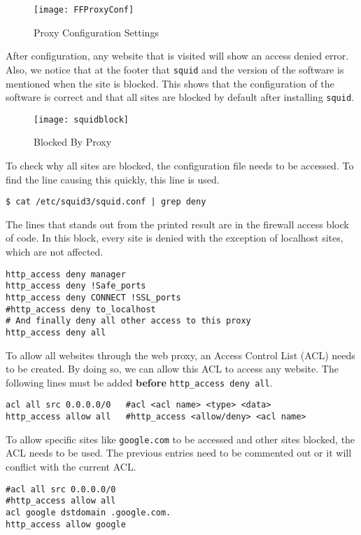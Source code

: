 \documentclass[a4paper,12pt]{article}
\begin{document}
\begin{figure}[H]
\centering
\texttt{[image: FFProxyConf]}
\caption{Proxy Configuration Settings}
\label{fig:ffproxyconf}
\end{figure}
\noindent After configuration, any website that is visited will show an access denied error. Also, we notice that at the footer that \texttt{squid} and the version of the software is mentioned when the site is blocked. This shows that the configuration of the software is correct and that all sites are blocked by default after installing \texttt{squid}.

\begin{figure}[H]
\centering
\texttt{[image: squidblock]}
\caption{Blocked By Proxy}
\label{fig:squidblock}
\end{figure}
\noindent To check why all sites are blocked, the configuration file needs to be accessed. To find the line causing this quickly, this line is used.
\begin{verbatim}
$ cat /etc/squid3/squid.conf | grep deny
\end{verbatim}
\noindent The lines that stands out from the printed result are in the firewall access block of code. In this block, every site is denied with the exception of localhost sites, which are not affected.
\begin{verbatim}
http_access deny manager
http_access deny !Safe_ports
http_access deny CONNECT !SSL_ports
#http_access deny to_localhost
# And finally deny all other access to this proxy
http_access deny all
\end{verbatim}
To allow all websites through the web proxy, an Access Control List (ACL) needs to be created. By doing so, we can allow this ACL to access any website. The following lines must be added \textbf{before} \texttt{http\_access deny all}.
\begin{verbatim}
acl all src 0.0.0.0/0   #acl <acl name> <type> <data>
http_access allow all   #http_access <allow/deny> <acl name>
\end{verbatim}
\noindent To allow specific sites like \texttt{google.com} to be accessed and other sites blocked, the ACL needs to be used. The previous entries need to be commented out or it will conflict with the current ACL.
\begin{verbatim}
#acl all src 0.0.0.0/0
#http_access allow all
acl google dstdomain .google.com.
http_access allow google
\end{verbatim}
\end{document}
